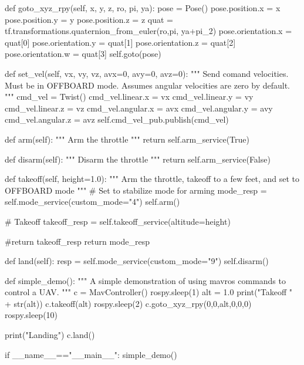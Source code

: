 \documentclass[a4paper,12pt]{article}
\begin{document}
\begin{MyCode}
	def goto_xyz_rpy(self, x, y, z, ro, pi, ya):
		pose = Pose()
		pose.position.x = x
		pose.position.y = y
		pose.position.z = z
		quat = tf.transformations.quaternion_from_euler(ro,pi,
		 					     ya+pi_2)
		pose.orientation.x = quat[0]
		pose.orientation.y = quat[1]
		pose.orientation.z = quat[2]
		pose.orientation.w = quat[3]
		self.goto(pose)
		
	def set_vel(self, vx, vy, vz, avx=0, avy=0, avz=0):
		"""
		Send comand velocities. Must be in OFFBOARD mode.
		Assumes angular velocities are zero by default.
		"""
		cmd_vel = Twist()
		cmd_vel.linear.x = vx
		cmd_vel.linear.y = vy
		cmd_vel.linear.z = vz
		cmd_vel.angular.x = avx
		cmd_vel.angular.y = avy
		cmd_vel.angular.z = avz
		self.cmd_vel_pub.publish(cmd_vel)
		
	def arm(self):
		"""
		Arm the throttle
		"""
		return self.arm_service(True)
		
	def disarm(self):
		"""
		Disarm the throttle
		"""
		return self.arm_service(False)
		
	def takeoff(self, height=1.0):
		"""
		Arm the throttle, takeoff to a few feet, and
		set to OFFBOARD mode
		"""
		# Set to stabilize mode for arming
		mode_resp = self.mode_service(custom_mode="4")
		self.arm()
	
		# Takeoff
		takeoff_resp = self.takeoff_service(altitude=height)
		
		#return takeoff_resp
		return mode_resp
		
	def land(self):	
		resp = self.mode_service(custom_mode="9")
		self.disarm()
	
def simple_demo():
	"""
	A simple demonstration of using
	mavros commands to control a UAV.
	"""
	c = MavController()
	rospy.sleep(1)
	alt = 1.0
	print("Takeoff " + str(alt))
	c.takeoff(alt)
	rospy.sleep(2)
	c.goto_xyz_rpy(0,0,alt,0,0,0)
	rospy.sleep(10)
	
	print("Landing")
	c.land()
	
if __name__=="__main__":
	simple_demo()

\end{MyCode}
\end{document}
